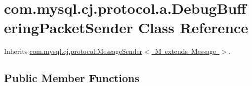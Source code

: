 \hypertarget{classcom_1_1mysql_1_1cj_1_1protocol_1_1a_1_1_debug_buffering_packet_sender}{}\section{com.\+mysql.\+cj.\+protocol.\+a.\+Debug\+Buffering\+Packet\+Sender Class Reference}
\label{classcom_1_1mysql_1_1cj_1_1protocol_1_1a_1_1_debug_buffering_packet_sender}


Inherits \mbox{\hyperlink{interfacecom_1_1mysql_1_1cj_1_1protocol_1_1_message_sender}{com.\+mysql.\+cj.\+protocol.\+Message\+Sender$<$ M extends Message $>$}}.

\subsection*{Public Member Functions}
